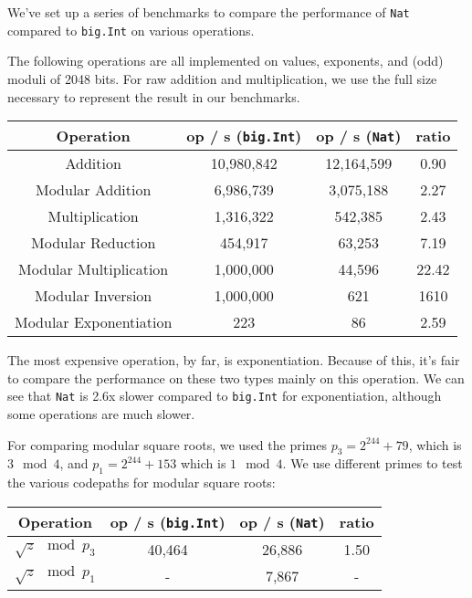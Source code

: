 \documentclass[11pt, a4paper]{article} %
\begin{document}
{We've set up a series of benchmarks to compare the performance
of \texttt{Nat} compared to \texttt{big.Int} on various operations.

The following operations are all implemented on values, exponents,
and (odd) moduli of 2048 bits. For raw addition and multiplication,
we use the full size necessary to represent the result in our benchmarks.

\begin{center}
 \begin{tabular}{|c | c | c | c|} 
 \hline
 Operation & op / s (\texttt{big.Int}) & op / s (\texttt{Nat}) & ratio \\ [0.5ex] 
 \hline\hline
 Addition & 10,980,842 & 12,164,599 & 0.90 \\
 \hline
 Modular Addition & 6,986,739 & 3,075,188 & 2.27 \\
 \hline
 Multiplication & 1,316,322 & 542,385 & 2.43 \\
 \hline
 Modular Reduction & 454,917 & 63,253 & 7.19 \\
 \hline
 Modular Multiplication & 1,000,000 & 44,596 & 22.42 \\
 \hline
 Modular Inversion & 1,000,000 & 621 & 1610 \\
 \hline
 Modular Exponentiation & 223 & 86 & 2.59 \\
 \hline
\end{tabular}
\end{center}

The most expensive operation, by far, is exponentiation. Because
of this, it's fair to compare the performance on these two types
mainly on this operation. We can see that \texttt{Nat} is 2.6x slower
compared to \texttt{big.Int} for exponentiation, although
some operations are much slower.

For comparing modular square roots, we used the primes
$p_3 = 2^{244} + 79$, which is $3 \mod 4$,
and $p_1 = 2^{244} + 153$ which is $1 \mod 4$. We use different primes
to test the various codepaths for modular square roots:

\begin{center}
 \begin{tabular}{|c | c | c | c|} 
 \hline
 Operation & op / s (\texttt{big.Int}) & op / s (\texttt{Nat}) & ratio \\ [0.5ex] 
 \hline\hline
 $\sqrt{z} \mod p_3$ & 40,464 & 26,886 & 1.50 \\
 \hline
 $\sqrt{z} \mod p_1$ & - & 7,867 & - \\
 \hline
\end{tabular}
\end{center}

}
\end{document}
